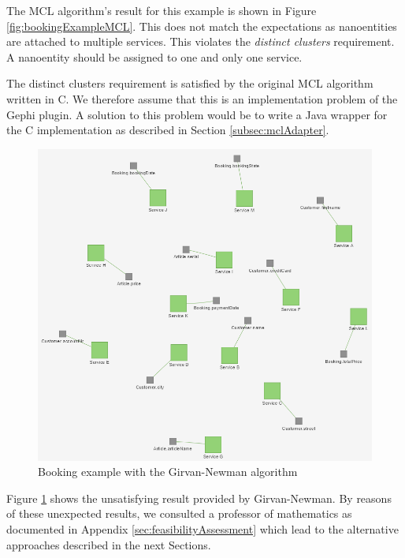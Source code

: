 The MCL algorithm's result for this example is shown in Figure \ref{fig:bookingExampleMCL}. This does not match the expectations as nanoentities are attached to multiple services. This violates the \textit{distinct clusters} requirement. A nanoentity should be assigned to one and only one service. 

The distinct clusters requirement is satisfied by the original MCL algorithm written in C. We therefore assume that this is  an implementation problem of the Gephi plugin\cite{gephiMarkov}. A solution to this problem would be to write a Java wrapper for the C implementation as described in Section \ref{subsec:mclAdapter}.

\begin{figure}[H]
	\begin{center}
		\includegraphics[scale=0.65]{images/girvan_entities_fail.png}
	\end{center}
	\caption{Booking example with the Girvan-Newman algorithm}
	\label{fig:bookingExampleGirvan}
\end{figure}

Figure \ref{fig:bookingExampleGirvan} shows the unsatisfying result provided by Girvan-Newman. By reasons of these unexpected results, we consulted a professor of mathematics as documented in Appendix \ref{sec:feasibilityAssessment} which lead to the alternative approaches described in the next Sections.

